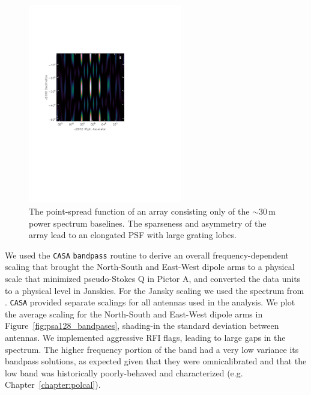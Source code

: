 \begin{figure}
\centering
\includegraphics[clip, trim=0.5cm 9cm 5cm 5cm, width=0.6\textwidth]{chapters/psa128_pol/figures/pretty_PSF_0-1.pdf}
\caption[The point-spread function of an array consisting only of the $\sim$30\,m power spectrum baselines.]{The point-spread function of an array consisting only of the $\sim$30\,m power spectrum baselines. The sparseness and asymmetry of the array lead to an elongated PSF with large grating lobes.}
\label{fig:psa128_psf}
\end{figure}

We used the {\tt CASA} {\tt bandpass} routine to derive an overall frequency-dependent scaling that brought the North-South and East-West dipole arms to a physical scale that minimized pseudo-Stokes Q in Pictor A, and converted the data units to a physical level in Janskies. For the Jansky scaling we used the spectrum from \cite{Jacobs.13}. {\tt CASA} provided separate scalings for all antennas used in the analysis. We plot the average scaling for the North-South and East-West dipole arms in Figure~\ref{fig:psa128_bandpases}, shading-in the standard deviation between antennas. We implemented aggressive RFI flags, leading to large gaps in the spectrum. The higher frequency portion of the band had a very low variance its bandpass solutions, as expected given that they were {\sc omnical}ibrated and that the low band was historically poorly-behaved and characterized (e.g. Chapter~\ref{chapter:polcal}).

